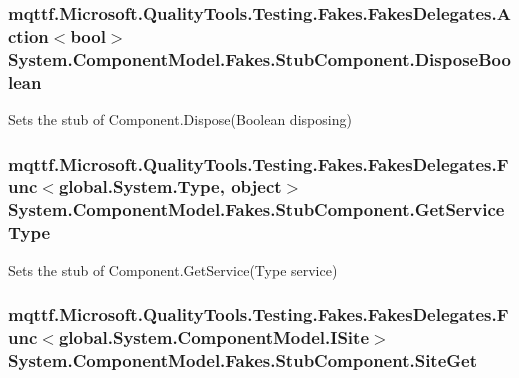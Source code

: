 \hypertarget{class_system_1_1_component_model_1_1_fakes_1_1_stub_component_a7b8eba432113c88ab2b060e48ece3d13}{
\subsubsection[{Dispose\-Boolean}]{\setlength{\rightskip}{0pt plus 5cm}mqttf.\-Microsoft.\-Quality\-Tools.\-Testing.\-Fakes.\-Fakes\-Delegates.\-Action$<$bool$>$ System.\-Component\-Model.\-Fakes.\-Stub\-Component.\-Dispose\-Boolean}}\label{class_system_1_1_component_model_1_1_fakes_1_1_stub_component_a7b8eba432113c88ab2b060e48ece3d13}


Sets the stub of Component.\-Dispose(\-Boolean disposing)

\hypertarget{class_system_1_1_component_model_1_1_fakes_1_1_stub_component_ad3e16a154104b3bd110b41edc2fa5589}{
\subsubsection[{Get\-Service\-Type}]{\setlength{\rightskip}{0pt plus 5cm}mqttf.\-Microsoft.\-Quality\-Tools.\-Testing.\-Fakes.\-Fakes\-Delegates.\-Func$<$global.\-System.\-Type, object$>$ System.\-Component\-Model.\-Fakes.\-Stub\-Component.\-Get\-Service\-Type}}\label{class_system_1_1_component_model_1_1_fakes_1_1_stub_component_ad3e16a154104b3bd110b41edc2fa5589}


Sets the stub of Component.\-Get\-Service(\-Type service)

\hypertarget{class_system_1_1_component_model_1_1_fakes_1_1_stub_component_a9dfa357736fcc2520b7a671ec8d12a4c}{
\subsubsection[{Site\-Get}]{\setlength{\rightskip}{0pt plus 5cm}mqttf.\-Microsoft.\-Quality\-Tools.\-Testing.\-Fakes.\-Fakes\-Delegates.\-Func$<$global.\-System.\-Component\-Model.\-I\-Site$>$ System.\-Component\-Model.\-Fakes.\-Stub\-Component.\-Site\-Get}}\label{class_system_1_1_component_model_1_1_fakes_1_1_stub_component_a9dfa357736fcc2520b7a671ec8d12a4c}


